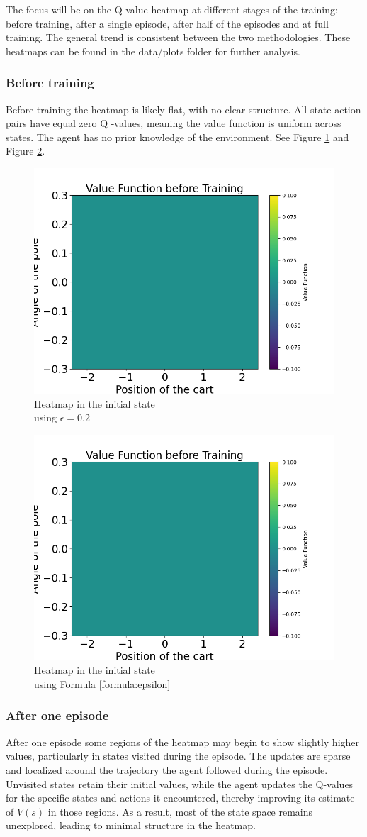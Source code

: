 \documentclass{article}
\begin{document}
The focus will be on the Q-value heatmap at different stages of the training: before training, after a single episode, after half of the episodes and at full training. The general trend is consistent between the two methodologies. These heatmaps can be found in the data/plots folder for further analysis.


\subsubsection{Before training}
Before training the heatmap is likely flat, with no clear structure. All state-action pairs have equal zero Q -values, meaning  the value function is uniform across states. The agent has no prior knowledge of the environment. See Figure \ref{fig:heatmap_init_costant} and Figure \ref{fig:heatmap_init_glie}.

\begin{figure}[h]
		\centering
		\includegraphics[height=0.28\linewidth]{../data/plot/heatmap_initial_training_constant_0.2.png}
		\caption{Heatmap in the initial state \\ using $\epsilon = 0.2$}
		\label{fig:heatmap_init_costant}
\end{figure}

\begin{figure}[h]
		\centering
		\includegraphics[height=0.28\linewidth]{../data/plot/heatmap_initial_training_glie.png}
		\caption{Heatmap in the initial state \\ using Formula \ref{formula:epsilon}}
		\label{fig:heatmap_init_glie}
\end{figure}

\newpage

\subsubsection{After one episode}
After one episode some regions of the heatmap may begin to show slightly higher values, particularly in states visited during the episode. The updates are sparse and localized around the trajectory the agent followed during the episode. Unvisited states retain their initial values, while the agent updates the Q-values for the specific states and actions it encountered, thereby improving its estimate of $ V(s) $  in those regions.
As a result, most of the state space remains unexplored, leading to minimal structure in the heatmap. 
\end{document}
